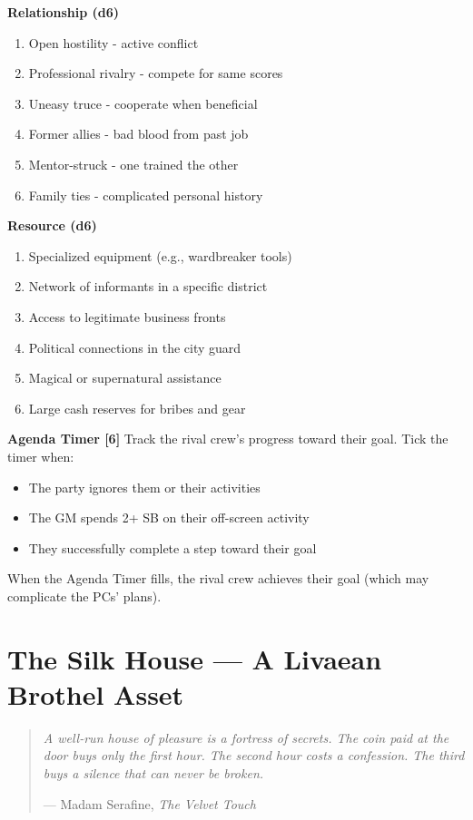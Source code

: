 \documentclass[10pt,twoside]{book}
\begin{document}
\noindent\textbf{Relationship (d6)}
\begin{enumerate}
\item Open hostility - active conflict
\item Professional rivalry - compete for same scores
\item Uneasy truce - cooperate when beneficial
\item Former allies - bad blood from past job
\item Mentor-struck - one trained the other
\item Family ties - complicated personal history
\end{enumerate}

\noindent\textbf{Resource (d6)}
\begin{enumerate}
\item Specialized equipment (e.g., wardbreaker tools)
\item Network of informants in a specific district
\item Access to legitimate business fronts
\item Political connections in the city guard
\item Magical or supernatural assistance
\item Large cash reserves for bribes and gear
\end{enumerate}

\noindent\textbf{Agenda Timer [6]}
Track the rival crew's progress toward their goal. Tick the timer when:
\begin{itemize}
\item The party ignores them or their activities
\item The GM spends 2+ SB on their off-screen activity
\item They successfully complete a step toward their goal
\end{itemize}
When the Agenda Timer fills, the rival crew achieves their goal (which may complicate the PCs' plans).


\chapter{The Silk House --- A Livaean Brothel Asset}
\label{app:silk-house}

\begin{quote}
\itshape
A well-run house of pleasure is a fortress of secrets. The coin paid at the door buys only the first hour. The second hour costs a confession. The third buys a silence that can never be broken.

\vspace{0.2cm}
--- Madam Serafine, \textit{The Velvet Touch}
\end{quote}
\end{document}
